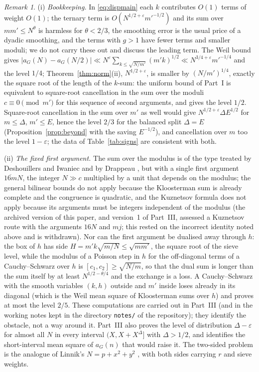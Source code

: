﻿\documentclass[11pt]{amsart}
\theoremstyle{remark}
\newtheorem{remark}[theorem]{Remark}
\newcommand{\e}{\varepsilon}
\begin{document}
\begin{remark}\label{rem:dispersion}
(i) \emph{Bookkeeping.} In \eqref{eq:dispmain} each $k$ contributes $O(1)$ terms of weight $O(1)$; the ternary term is $O(N^{1/2+\e}m'^{-1/2})$ and its sum over $mm'\le N^\theta$ is harmless for $\theta<2/3$, the smoothing error is the usual price of a dyadic smoothing, and the terms with $g>1$ have fewer terms and smaller moduli; we do not carry these out and discuss the leading term. The Weil bound gives $|a_G(N)-a_G(N/2)|\ll N^\e\sum_{k\le\sqrt{N/m'}}(m'k)^{1/2}\ll N^{3/4+\e}m'^{-1/4}$ and the level $1/4$; Theorem~\ref{thm:norm}(ii), $N^{1/2+\e}$, is smaller by $(N/m')^{1/4}$, exactly the square root of the length of the $k$-sum: the uniform bound of Part~I is equivalent to square-root cancellation in the sum over the moduli $c\equiv0\pmod{m'}$ for this sequence of second arguments, and gives the level $1/2$. Square-root cancellation in the sum over $m'$ as well would give $N^{1/2+\e}\Delta E^{1/2}$ for $m\le\Delta$, $m'\le E$, hence the level $2/3$ for the balanced split $\Delta=E$ (Proposition~\ref{prop:beyond} with the saving $E^{-1/2}$), and cancellation over $m$ too the level $1-\e$; the data of Table~\ref{tab:signs} are consistent with both.

(ii) \emph{The fixed first argument.} The sum over the modulus is of the type treated by Deshouillers and Iwaniec \cite{DI} and by Drappeau \cite{Drappeau}, but with a single first argument $\overline{16m}N$, the integer $N\gg c$ multiplied by a unit that depends on the modulus; the general bilinear bounds do not apply because the Kloosterman sum is already complete and the congruence is quadratic, and the Kuznetsov formula does not apply because its arguments must be integers independent of the modulus (the archived version of this paper, and version~1 of Part~III, assessed a Kuznetsov route with the arguments $16N$ and $mj$; this rested on the incorrect identity noted above and is withdrawn). Nor can the first argument be dualised away through $h$: the box of $h$ has side $H=m'k\sqrt{m/N}\le\sqrt{mm'}$, the square root of the sieve level, while the modulus of a Poisson step in $h$ for the off-diagonal terms of a Cauchy--Schwarz over $h$ is $[c_1,c_2]\ge\sqrt{N/m}$, so that the dual sum is longer than the sum itself by at least $N^{1/2-\theta/4}$ and the exchange is a loss. A Cauchy--Schwarz with the smooth variables $(k,h)$ outside and $m'$ inside loses already in its diagonal (which is the Weil mean square of Kloosterman sums over $h$) and proves at most the level $2/5$. These computations are carried out in Part~III \cite{ChenIII} (and in the working notes kept in the directory \texttt{notes/} of the repository); they identify the obstacle, not a way around it. Part~III also proves the level of distribution $\Delta-\e$ for almost all $N$ in every interval $(X,X+X^\Delta]$ with $\Delta>1/2$, and identifies the short-interval mean square of $a_G(n)$ that would raise it. The two-sided problem is the analogue of Linnik's $N=p+x^2+y^2$ \cite{Linnik}, with both sides carrying $r$ and sieve weights.
\end{remark}
\end{document}
